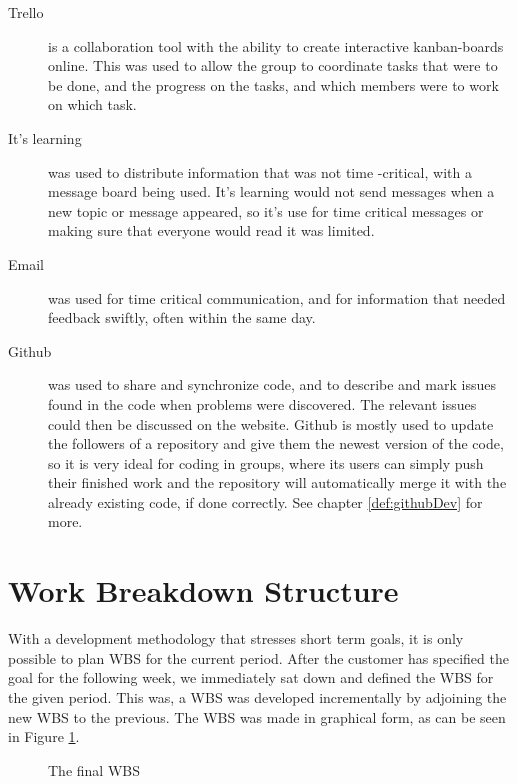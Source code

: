 \begin{description}

\item[Trello]  \label{def:trello} is a collaboration tool with the ability to create interactive kanban-boards online. This was used to allow the group to coordinate tasks that were to be done, and the progress on the tasks, and which members were to work on which task. 

\item[It's learning] was used to distribute information that was not time -critical, with a message board being used. It's learning would not send messages when a new topic or message appeared, so it's use for time critical messages or making sure that everyone would read it was limited. 

\item[Email] was used for time critical communication, and for information that needed feedback swiftly, often within the same day.

\item[Github] \label{def:github} was used to share and synchronize code, and to describe and mark issues found in the code when problems were discovered. The relevant issues could then be discussed on the website.
Github is mostly used to update the followers of a repository and give them the newest version of the code, so it is  very ideal for coding in groups, where its users can simply push their finished work and the repository will automatically merge it with the already existing code, if done correctly. See chapter \ref{def:githubDev} for more.
\end{description}

\section{Work Breakdown Structure}
With a development methodology that stresses short term goals, it is only possible to plan WBS for the current period. After the customer has specified the goal for the following week, we immediately sat down and defined the WBS for the given period. This was, a WBS was developed incrementally by adjoining the new WBS to the previous. The WBS was made in graphical form, as can be seen in Figure \ref{fig:WBS}.

\begin{figure}[p]

\setlength\fboxsep{0pt}
\setlength\fboxrule{1pt}\noindent{}

\caption{The final WBS}
\label{fig:WBS}
\end{figure}

